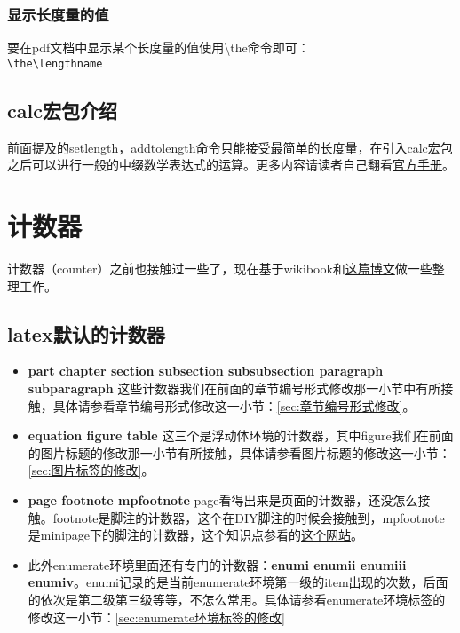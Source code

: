 \documentclass[11pt,oneside]{book}
\begin{document}
      \subsection{显示长度量的值}
      要在pdf文档中显示某个长度量的值使用\textbackslash the命令即可：\\
      \verb+\the\lengthname+

      \section{calc宏包介绍}
      前面提及的setlength，addtolength命令只能接受最简单的长度量，在引入calc宏包之后可以进行一般的中缀数学表达式的运算。更多内容请读者自己翻看\href{http://mirrors.ctan.org/macros/latex/required/tools/calc.pdf}{官方手册}。




      \chapter{计数器}
      计数器（counter）之前也接触过一些了，现在基于wikibook和\href{http://texblog.org/2007/07/25/counters-in-latex/}{这篇博文}做一些整理工作。


      \section{latex默认的计数器}
      \begin{itemize}
      \item \textbf{part chapter section subsection subsubsection paragraph \linebreak subparagraph} 这些计数器我们在前面的章节编号形式修改那一小节中有所接触，具体请参看章节编号形式修改这一小节：\ref{sec:章节编号形式修改}。
      \item \textbf{equation figure table} 这三个是浮动体环境的计数器，其中figure我们在前面的图片标题的修改那一小节有所接触，具体请参看图片标题的修改这一小节：\ref{sec:图片标签的修改}。
      \item \textbf{page footnote mpfootnote} page看得出来是页面的计数器，还没怎么接触。footnote是脚注的计数器，这个在DIY脚注的时候会接触到，mpfootnote是minipage下的脚注的计数器，这个知识点参看的\href{http://tex.stackexchange.com/questions/18499/how-to-change-symbol-for-footnote-in-minipage}{这个网站}。
      \item 此外enumerate环境里面还有专门的计数器：\textbf{enumi enumii enumiii enumiv}。enumi记录的是当前enumerate环境第一级的item出现的次数，后面的依次是第二级第三级等等，不怎么常用。具体请参看enumerate环境标签的修改这一小节：\ref{sec:enumerate环境标签的修改}
      \end{itemize}
\end{document}
